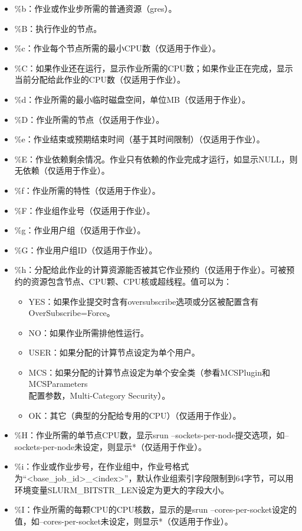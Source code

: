 \begin{itemize}
\begin{itemize}
\begin{itemize}
    \item \%b：作业或作业步所需的普通资源（gres）。
    \item \%B：执行作业的节点。
    \item \%c：作业每个节点所需的最小CPU数（仅适用于作业）。
    \item \%C：如果作业还在运行，显示作业所需的CPU数；如果作业正在完成，显示当前分配给此作业的CPU数（仅适用于作业）。
    \item \%d：作业所需的最小临时磁盘空间，单位MB（仅适用于作业）。
    \item \%D：作业所需的节点（仅适用于作业）。
    \item \%e：作业结束或预期结束时间（基于其时间限制）（仅适用于作业）。
    \item \%E：作业依赖剩余情况。作业只有依赖的作业完成才运行，如显示NULL，则无依赖（仅适用于作业）。
    \item \%f：作业所需的特性（仅适用于作业）。
    \item \%F：作业组作业号（仅适用于作业）。
    \item \%g：作业用户组（仅适用于作业）。
    \item \%G：作业用户组ID（仅适用于作业）。
    \item \%h：分配给此作业的计算资源能否被其它作业预约（仅适用于作业）。可被预约的资源包含节点、CPU颗、CPU核或超线程。值可以为：
\begin{itemize}
	\item YES：如果作业提交时含有oversubscribe选项或分区被配置含有\\OverSubscribe=Force。
   	\item NO：如果作业所需排他性运行。
   	\item USER：如果分配的计算节点设定为单个用户。
   	\item MCS：如果分配的计算节点设定为单个安全类（参看MCSPlugin和MCSParameters\\配置参数，Multi-Category Security）。
   	\item OK：其它（典型的分配给专用的CPU）（仅适用于作业）。
\end{itemize}
    \item \%H：作业所需的单节点CPU数，显示srun --sockets-per-node提交选项，如--sockets-per-node未设定，则显示*（仅适用于作业）。
    \item \%i：作业或作业步号，在作业组中，作业号格式为``<base\_job\_id>\_<index>''，默认作业组索引字段限制到64字节，可以用环境变量SLURM\_BITSTR\_LEN设定为更大的字段大小。
    \item \%I：作业所需的每颗CPU的CPU核数，显示的是srun --cores-per-socket设定的值，如--cores-per-socket未设定，则显示*（仅适用于作业）。

\end{itemize}
\end{itemize}
\end{itemize}
